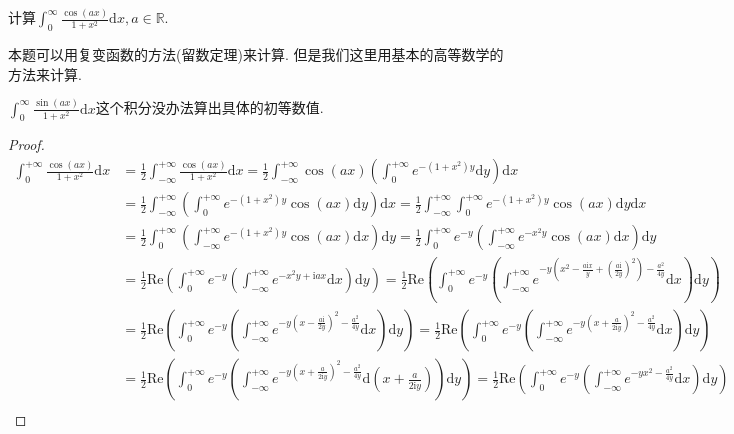 \documentclass[../../main.tex]{subfiles}%
\begin{document}
\begin{example}
计算$\int_{0}^{\infty}\frac{\cos(ax)}{1 + x^{2}}\mathrm{d}x, a\in\mathbb{R}$. 
\end{example}
\begin{remark}
本题可以用复变函数的方法(留数定理)来计算. 但是我们这里用基本的高等数学的方法来计算.

$\int_0^{\infty}{\frac{\sin \left( ax \right)}{1+x^2}\mathrm{d}x}$这个积分没办法算出具体的初等数值.
\end{remark}
\begin{proof}

\begin{align*}
\int_0^{+\infty}{\frac{\cos \left( ax \right)}{1+x^2}\mathrm{d}x}&=\frac{1}{2}\int_{-\infty}^{+\infty}{\frac{\cos \left( ax \right)}{1+x^2}\mathrm{d}x}=\frac{1}{2}\int_{-\infty}^{+\infty}{\cos \left( ax \right) \left( \int_0^{+\infty}{e^{-\left( 1+x^2 \right) y}\mathrm{d}y} \right) \mathrm{d}x}\\
&=\frac{1}{2}\int_{-\infty}^{+\infty}{\left( \int_0^{+\infty}{e^{-\left( 1+x^2 \right) y}\cos \left( ax \right) \mathrm{d}y} \right) \mathrm{d}x}=\frac{1}{2}\int_{-\infty}^{+\infty}{\int_0^{+\infty}{e^{-\left( 1+x^2 \right) y}\cos \left( ax \right) \mathrm{d}y}}\mathrm{d}x\\
&=\frac{1}{2}\int_0^{+\infty}{\left( \int_{-\infty}^{+\infty}{e^{-\left( 1+x^2 \right) y}\cos \left( ax \right) \mathrm{d}x} \right) \mathrm{d}y}=\frac{1}{2}\int_0^{+\infty}{e^{-y}\left( \int_{-\infty}^{+\infty}{e^{-x^2y}\cos \left( ax \right) \mathrm{d}x} \right)}\mathrm{d}y\\
&=\frac{1}{2}\mathrm{Re}\left( \int_0^{+\infty}{e^{-y}\left( \int_{-\infty}^{+\infty}{e^{-x^2y+\mathrm{i}ax}\mathrm{d}x} \right) \mathrm{d}y} \right) =\frac{1}{2}\mathrm{Re}\left( \int_0^{+\infty}{e^{-y}\left( \int_{-\infty}^{+\infty}{e^{-y\left( x^2-\frac{a\mathrm{i}x}{y}+\left( \frac{a\mathrm{i}}{2y} \right) ^2 \right) -\frac{a^2}{4y}}\mathrm{d}x} \right) \mathrm{d}y} \right) \\
&=\frac{1}{2}\mathrm{Re}\left( \int_0^{+\infty}{e^{-y}\left( \int_{-\infty}^{+\infty}{e^{-y\left( x-\frac{a\mathrm{i}}{2y} \right) ^2-\frac{a^2}{4y}}\mathrm{d}x} \right) \mathrm{d}y} \right) =\frac{1}{2}\mathrm{Re}\left( \int_0^{+\infty}{e^{-y}\left( \int_{-\infty}^{+\infty}{e^{-y\left( x+\frac{a}{2\mathrm{i}y} \right) ^2-\frac{a^2}{4y}}\mathrm{d}x} \right) \mathrm{d}y} \right) \\
&=\frac{1}{2}\mathrm{Re}\left( \int_0^{+\infty}{e^{-y}\left( \int_{-\infty}^{+\infty}{e^{-y\left( x+\frac{a}{2\mathrm{i}y} \right) ^2-\frac{a^2}{4y}}\mathrm{d}\left( x+\frac{a}{2\mathrm{i}y} \right)} \right) \mathrm{d}y} \right) =\frac{1}{2}\mathrm{Re}\left( \int_0^{+\infty}{e^{-y}\left( \int_{-\infty}^{+\infty}{e^{-yx^2-\frac{a^2}{4y}}\mathrm{d}x} \right) \mathrm{d}y} \right) \\

\end{align*}
\end{proof}
\end{document}
